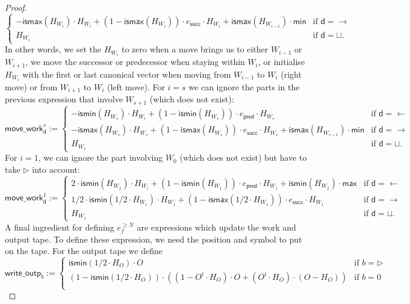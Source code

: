 \begin{proof}
$$\begin{cases}
		-\mathsf{ismax}(H_{W_i})\cdot H_{W_i} + (1-\mathsf{ismax}(H_{W_i}))\cdot e_{\mathsf{succ}}\cdot H_{W_i} + \mathsf{ismax}(H_{W_{i-1}})\cdot\mathsf{min} & \text{if $\mathsf{d}=\rightarrow$}\\
	H_{W_i} & \text{if $\mathsf{d}=\sqcup$}. 	
\end{cases}
$$
In other words, we set the $H_{W_i}$ to zero when a move brings us to either $W_{i-1}$ or $W_{i+1}$, we
move the successor or predecessor when staying within $W_i$, or initialise $H_{W_i}$ with the first or last canonical vector when moving from $W_{i-1}$ to $W_i$ (right move) or from $W_{i+1}$ to $W_i$ (left move).
For $i=s$ we can ignore the parts in the previous expression that involve $W_{s+1}$ (which does not exist):
$$
\mathsf{move\_work}^s_{\mathsf{d}}:=
\begin{cases}
	-\mathsf{ismin}(H_{W_s})\cdot H_{W_i} + (1-\mathsf{ismin}(H_{W_s}))\cdot e_{\mathsf{pred}}\cdot H_{W_s}  & \text{if $\mathsf{d}=\leftarrow$}\\
		-\mathsf{ismax}(H_{W_s}) \cdot H_{W_s} + (1-\mathsf{ismax}(H_{W_s}))\cdot e_{\mathsf{succ}}\cdot H_{W_s} + \mathsf{ismax}(H_{W_{s-1}})\cdot \mathsf{min} & \text{if $\mathsf{d}=\rightarrow$}\\
	H_{W_s} & \text{if $\mathsf{d}=\sqcup$}. 	
\end{cases}
$$
For $i=1$, we can ignore the part involving $W_{0}$ (which does not exist) but have to take $\rhd$ into account:
$$
\mathsf{move\_work}^1_{\mathsf{d}}:=
\begin{cases}
	2\cdot \mathsf{ismin}(H_{W_1})\cdot H_{W_i} + (1-\mathsf{ismin}(H_{W_1}))\cdot e_{\mathsf{pred}}\cdot H_{W_1} + \mathsf{ismin}(H_{W_{2}})\cdot\mathsf{max} & \text{if $\mathsf{d}=\leftarrow$}\\
		1/2\cdot\mathsf{ismin}(1/2\cdot H_{W_1})\cdot H_{W_1} + (1-\mathsf{ismax}(1/2\cdot H_{W_1}))\cdot e_{\mathsf{succ}}\cdot H_{W_1}  & \text{if $\mathsf{d}=\rightarrow$}\\
	H_{W_1} & \text{if $\mathsf{d}=\sqcup$}. 	
\end{cases}
$$
A final ingredient for defining $e_f^{\geq N}$ are expressions which update the work and output tape.
To define these expression, we need the position and symbol to put on the tape. For the output tape we define
$$
\mathsf{write\_outp}_b:=\begin{cases}
\mathsf{ismin}(1/2\cdot H_O)\cdot O & \text{if $b=\rhd$}\\
(1-\mathsf{ismin}(1/2\cdot H_O))\cdot\left((1-O^t\cdot H_O)\cdot O + (O^t\cdot H_O)\cdot (O-H_O)\right) &\text{if $b=0$}\\

\end{cases}$$
\end{proof}
